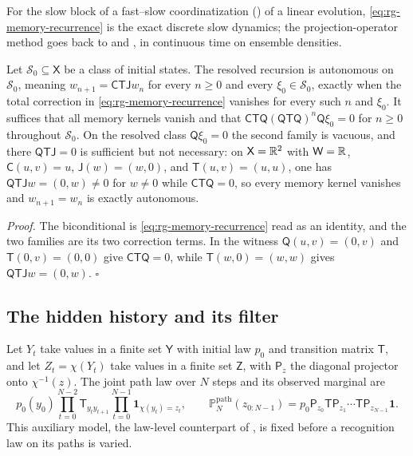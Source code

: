 For the slow block of a fast--slow coordinatization
() of a linear evolution,
\eqref{eq:rg-memory-recurrence} is the exact discrete slow dynamics; the
projection-operator method goes back to \citet{Nakajima1958} and
\citet{Zwanzig1960}, in continuous time on ensemble densities.

Let $\mathscr S_0\subseteq\mathsf X$ be a class of initial states. The resolved
recursion is autonomous on $\mathscr S_0$, meaning $w_{n+1}=\mathsf C\mathsf T\mathsf
Jw_n$ for every $n\ge0$ and every $\xi_0\in\mathscr S_0$, exactly when the total
correction in \eqref{eq:rg-memory-recurrence} vanishes for every such $n$ and
$\xi_0$. It suffices that all memory kernels vanish and that
$\mathsf C\mathsf T\mathsf Q(\mathsf Q\mathsf T\mathsf Q)^n\mathsf Q\xi_0=0$ for
$n\ge0$ throughout $\mathscr S_0$. On the resolved class $\mathsf Q\xi_0=0$ the
second family is vacuous, and there $\mathsf Q\mathsf T\mathsf J=0$ is sufficient but
not necessary: on $\mathsf X=\mathbb R^2$ with $\mathsf W=\mathbb R$, $\mathsf C(u,v)=u$,
$\mathsf J(w)=(w,0)$, and $\mathsf T(u,v)=(u,u)$, one has
$\mathsf Q\mathsf T\mathsf Jw=(0,w)\ne0$ for $w\ne0$ while $\mathsf C\mathsf T\mathsf
Q=0$, so every memory kernel vanishes and $w_{n+1}=w_n$ is exactly autonomous.

\noindent\emph{Proof.}
The biconditional is \eqref{eq:rg-memory-recurrence} read as an identity, and the two
families are its two correction terms. In the witness
$\mathsf Q(u,v)=(0,v)$ and $\mathsf T(0,v)=(0,0)$ give $\mathsf C\mathsf T\mathsf Q=0$,
while $\mathsf T(w,0)=(w,w)$ gives $\mathsf Q\mathsf T\mathsf Jw=(0,w)$. $\square$

\subsection{The hidden history and its filter}
\label{sec:rg-memory-hidden-history}

Let $Y_t$ take values in a finite set $\mathsf Y$ with initial law $p_0$ and
transition matrix $\mathsf T$, and let $Z_t=\chi(Y_t)$ take values in a finite set
$\mathsf Z$, with $\mathsf P_z$ the diagonal projector onto $\chi^{-1}(z)$. The
joint path law over $N$ steps and its observed marginal are
\begin{equation}
p_0(y_0)\prod_{t=0}^{N-2}\mathsf T_{y_ty_{t+1}}\prod_{t=0}^{N-1}\mathbf 1_{\chi(y_t)=z_t},
\qquad
\mathbb P^{\mathrm{path}}_N(z_{0:N-1})
=p_0\mathsf P_{z_0}\mathsf T\mathsf P_{z_1}\cdots\mathsf T\mathsf P_{z_{N-1}}\mathbf 1 .
\label{eq:rg-memory-hidden-path}
\end{equation}
This auxiliary model, the law-level counterpart of ,
is fixed before a recognition law on its paths is varied.

